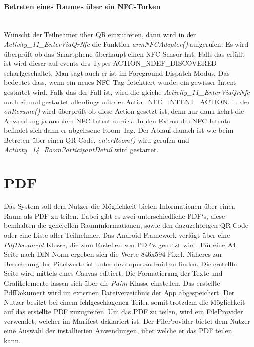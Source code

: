\paragraph{Betreten eines Raumes über ein NFC-Torken}\mbox{}\\
\label{paragraph:NFC}
Wünscht der Teilnehmer über QR einzutreten, dann wird in der \textit{Activity\_11\_EnterViaQrNfc} die Funktion \textit{armNFCAdapter()} aufgerufen. Es wird überprüft ob das Smartphone überhaupt einen NFC Sensor hat.
Falls das erfüllt ist wird dieser auf events des Types ACTION\_NDEF\_DISCOVERED scharfgeschaltet. 
Man sagt auch er ist im Foreground-Dispatch-Modus.
Das bedeutet dass, wenn ein neues NFC-Tag detektiert wurde, ein gewisser Intent gestartet wird. 
Falls das der Fall ist, wird die gleiche \textit{Activity\_11\_EnterViaQrNfc} noch einmal gestartet allerdings mit der Action NFC\_INTENT\_ACTION. 
In der \textit{onResume()} wird überprüft ob diese Action gesetzt ist, denn nur dann kehrt die Anwendung ja aus dem NFC-Intent zurück. 
In den Extras des NFC-Intents befindet sich dann er abgelesene Room-Tag. Der Ablauf danach ist wie beim Betreten über einen QR-Code. \textit{enterRoom()} wird gerufen und \textit{Activity\_14\_RoomParticipantDetail} wird gestartet.




\section{PDF}
\label{sec:PDF}
Das System soll dem Nutzer die Möglichkeit bieten Informationen über einen Raum als PDF zu teilen. Dabei gibt es zwei unterschiedliche PDF‘s, diese beinhalten die generellen Rauminformationen, sowie den dazugehörigen QR-Code oder eine Liste aller Teilnehmer.
Das Android-Framework  verfügt über eine \textit{PdfDocument} Klasse, die zum Erstellen von PDF‘s genutzt wird. Für eine A4 Seite nach DIN Norm ergeben sich die Werte 846x594 Pixel. Näheres zur Berechnung der Pixelwerte ist unter \href{https://developer.android.com/reference/android/graphics/pdf/PdfDocument.PageInfo}{developer.android} zu finden. Die erstellte Seite wird mittels eines Canvas editiert. Die Formatierung  der Texte und Grafikelemente lassen sich über die \textit{Paint} Klasse einstellen.
Das erstellte PdfDokument wird im externen Dateiverzeichnis der App abgespeichert. Der Nutzer besitzt bei einem fehlgeschlagenen Teilen somit trotzdem die Möglichkeit auf das erstellte PDF zuzugreifen.
Um das PDF zu teilen, wird ein FileProvider verwendet, welcher im Manifest deklariert ist.  Der FileProvider bietet dem Nutzer eine Auswahl der installierten Anwendungen, über welche er das PDF teilen kann.

